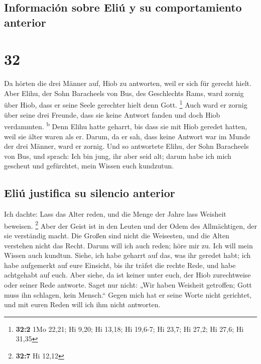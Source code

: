 \hypertarget{informaciuxf3n-sobre-eliuxfa-y-su-comportamiento-anterior}{%
\subsection{Información sobre Eliú y su comportamiento
anterior}\label{informaciuxf3n-sobre-eliuxfa-y-su-comportamiento-anterior}}

\hypertarget{section-31}{%
\section{32}\label{section-31}}

 Da hörten die drei Männer auf, Hiob zu antworten, weil er
sich für gerecht hielt.  Aber Elihu, der Sohn Baracheels
von Bus, des Geschlechts Rams, ward zornig über Hiob, dass er seine
Seele gerechter hielt denn Gott. \footnote{\textbf{32:2} 1Mo 22,21; Hi
  9,20; Hi 13,18; Hi 19,6-7; Hi 23,7; Hi 27,2; Hi 27,6; Hi 31,35}
 Auch ward er zornig über seine drei Freunde, dass sie
keine Antwort fanden und doch Hiob verdammten. \textsuperscript{b}
 Denn Elihu hatte geharrt, bis dass sie mit Hiob geredet
hatten, weil sie älter waren als er.  Darum, da er sah,
dass keine Antwort war im Munde der drei Männer, ward er zornig.
 Und so antwortete Elihu, der Sohn Baracheels von Bus, und
sprach: Ich bin jung, ihr aber seid alt; darum habe ich mich gescheut
und gefürchtet, mein Wissen euch kundzutun.

\hypertarget{eliuxfa-justifica-su-silencio-anterior}{%
\subsection{Eliú justifica su silencio
anterior}\label{eliuxfa-justifica-su-silencio-anterior}}

 Ich dachte: Lass das Alter reden, und die Menge der Jahre
lass Weisheit beweisen. \footnote{\textbf{32:7} Hi 12,12} 
Aber der Geist ist in den Leuten und der Odem des Allmächtigen, der sie
verständig macht.  Die Großen sind nicht die Weisesten,
und die Alten verstehen nicht das Recht.  Darum will ich
auch reden; höre mir zu. Ich will mein Wissen auch kundtun.
 Siehe, ich habe geharrt auf das, was ihr geredet habt;
ich habe aufgemerkt auf eure Einsicht, bis ihr träfet die rechte Rede,
 und habe achtgehabt auf euch. Aber siehe, da ist keiner
unter euch, der Hiob zurechtweise oder seiner Rede antworte.
 Saget nur nicht: „Wir haben Weisheit getroffen; Gott
muss ihn schlagen, kein Mensch.``  Gegen mich hat er
seine Worte nicht gerichtet, und mit euren Reden will ich ihm nicht
antworten.

